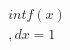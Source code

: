 \documentclass[preview]{standalone}
\begin{document}
\begin{align*}
\quad\\int f(x) \quad\\, dx = 1
\end{align*}
\end{document}
